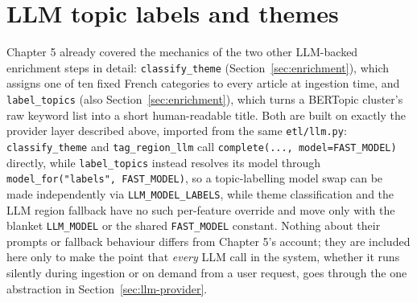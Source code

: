 \section{LLM topic labels and themes}
\label{sec:genai-themes}
\begin{sloppypar}
Chapter 5 already covered the mechanics of the two other LLM-backed enrichment steps in detail: \texttt{classify\_theme} (Section~\ref{sec:enrichment}), which assigns one of ten fixed French categories to every article at ingestion time, and \texttt{label\_topics} (also Section~\ref{sec:enrichment}), which turns a BERTopic cluster's raw keyword list into a short human-readable title. Both are built on exactly the provider layer described above, imported from the same \texttt{etl/llm.py}: \texttt{classify\_theme} and \texttt{tag\_region\_llm} call \texttt{complete(..., model=FAST\_MODEL)} directly, while \texttt{label\_topics} instead resolves its model through \texttt{model\_for("labels", FAST\_MODEL)}, so a topic-labelling model swap can be made independently via \texttt{LLM\_MODEL\_LABELS}, while theme classification and the LLM region fallback have no such per-feature override and move only with the blanket \texttt{LLM\_MODEL} or the shared \texttt{FAST\_MODEL} constant. Nothing about their prompts or fallback behaviour differs from Chapter 5's account; they are included here only to make the point that \emph{every} LLM call in the system, whether it runs silently during ingestion or on demand from a user request, goes through the one abstraction in Section~\ref{sec:llm-provider}.
\end{sloppypar}

